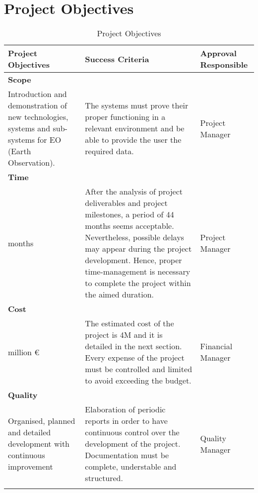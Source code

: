\section{Project Objectives}
\begin{center}
	\begin{longtable}{>{\raggedright\arraybackslash}p{5cm} >{\raggedright\arraybackslash}p{5cm} >{\raggedleft\arraybackslash}p{2.5cm}}
		\toprule[2pt]
		\textbf{Project Objectives} & \textbf{Success Criteria} & \textbf{Approval Responsible} \\
		\midrule \endhead
		\textbf{Scope} &  &  \\
		\hline
		Introduction and demonstration of new technologies, systems and sub-systems for EO (Earth Observation). & The systems must prove their proper functioning in a relevant environment and be able to provide the user the required data. & Project Manager \\
		\hline
		\textbf{Time} &  &   \\
		\hline
		44 months & After the analysis of project deliverables and project milestones, a period of 44 months seems acceptable. Nevertheless, possible delays may appear during the project development. Hence, proper time-management is necessary to complete the project within the aimed duration. & Project Manager  \\
		\hline
		\textbf{Cost} &  &   \\
		\hline
		4 million \euro & The estimated cost of the project is 4M  and it is detailed in the next section. Every expense of the project must be controlled and limited to avoid exceeding the budget. & Financial Manager  \\	
		\hline
		\textbf{Quality} &  &   \\
		\hline
		Organised, planned and detailed development with continuous improvement & 
 Elaboration of periodic reports in order to have continuous control over the development of the project. \newline
 Documentation must be complete, understable and structured.
 
 		& Quality Manager  \\	
		\bottomrule[2pt]
		\caption{Project Objectives}
	\end{longtable}
\end{center}